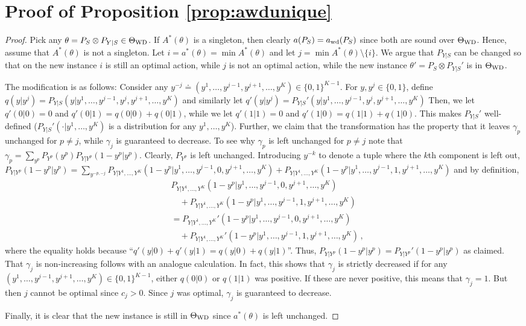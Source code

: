 \section*{Proof of Proposition \ref{prop:awdunique}}
\begin{proof}
	Pick any $\theta = P_S\otimes P_{Y|S}\in \Theta_{\mathrm{WD}}$. If $A^*(\theta)$ is a singleton, then clearly $a(P_S) = a_{\mathrm{wd}}(P_S)$ since both are sound over $\Theta_{\mathrm{WD}}$.
	Hence, assume that $A^*(\theta)$ is not a singleton.
	Let $i = a^*(\theta) = \min A^*(\theta)$ and let $j = \min A^*(\theta) \setminus \{ i \}$.
	We argue that $P_{Y|S}$ can be changed so that on the new instance $i$ is still an optimal action, while
	$j$ is not an optimal action, while the new instance $\theta' = P_S \otimes P_{Y|S}'$ is in $\Theta_{\mathrm{WD}}$.
	
	The modification is as follows:
	Consider any $y^{-j} \doteq (y^1,\dots,y^{j-1},y^{j+1},\dots,y^K)\in \{0,1\}^{K-1}$.
	For $y,y^j\in \{0,1\}$, define 
	$q(y|y^j) = P_{Y|S}(y|y^1, \dots, y^{j-1}, y^j, y^{j+1},\dots, y^K)$
	and similarly let
	$q'(y|y^j) = P_{Y|S}'(y|y^1, \dots, y^{j-1}, y^j, y^{j+1},\dots, y^K)$
	Then, we let $q'(0|0) = 0$ and $q'(0|1) = q(0|0) + q(0|1)$,
	while we let  $q'(1|1) = 0$ and $q'(1|0) = q(1|1) + q(1|0)$.
	This makes $P_{Y|S}'$ well-defined ($P_{Y|S}'(\cdot|y^1,\dots,y^K)$ is a distribution for any $y^1,\dots,y^K$).
	Further, we claim that the transformation has the property that 
	it leaves $\gamma_p$ unchanged for $p\ne j$, while $\gamma_j$ is guaranteed to decrease.
	To see why $\gamma_p$ is left unchanged for $p\ne j$ note that
	$\gamma_p = \sum_{y^p}  P_{Y^p}(y^p) P_{Y|Y^p}(1-y^p|y^p)$.
	Clearly, $P_{Y^p}$ is left unchanged.
	Introducing $y^{-k}$ to denote a tuple where the $k$th component is left out,
	$P_{Y|Y^p}(1-y^p|y^p) = \sum_{y^{-p,-j}} P_{Y|Y^1,\dots,Y^K}( 1-y^p | y^1,\dots, y^{j-1}, 0, y^{j+1}, \dots, y^K )
	+P_{Y|Y^1,\dots,Y^K}( 1-y^p | y^1,\dots, y^{j-1}, 1, y^{j+1}, \dots, y^K )$
	and by definition,
	\begin{align*}
	& P_{Y|Y^1,\dots,Y^K}( 1-y^p | y^1,\dots, y^{j-1}, 0, y^{j+1}, \dots, y^K )\\
	&\quad +P_{Y|Y^1,\dots,Y^K}( 1-y^p | y^1,\dots, y^{j-1}, 1, y^{j+1}, \dots, y^K )\\
	&
	=
	P_{Y|Y^1,\dots,Y^K}'( 1-y^p | y^1,\dots, y^{j-1}, 0, y^{j+1}, \dots, y^K )\\
	&\quad+P_{Y|Y^1,\dots,Y^K}'( 1-y^p | y^1,\dots, y^{j-1}, 1, y^{j+1}, \dots, y^K )\,,
	\end{align*}
	where the equality holds because ``$q'(y|0)+q'(y|1) = q(y|0) + q(y|1)$''.
	Thus, $P_{Y|Y^p}(1-y^p|y^p) = P_{Y|Y^p}'(1-y^p|y^p)$ as claimed.
	That $\gamma_j$ is non-increasing follows with an analogue calculation.
	In fact, this shows that $\gamma_j$ is strictly decreased
	if for any $(y^1,\dots,y^{j-1},y^{j+1},\dots,y^K)\in \{0,1\}^{K-1}$, either $q(0|0)$ or $q(1|1)$ was positive.
	If these are never positive, this means that $\gamma_j=1$. 
	But then $j$ cannot be optimal since $c_j>0$.
	Since $j$ was optimal, $\gamma_j$ is guaranteed to decrease.
	
	Finally, it is clear that the new instance is still in $\Theta_{\mathrm{WD}}$ since  $a^*(\theta)$ is left unchanged.
\end{proof}

